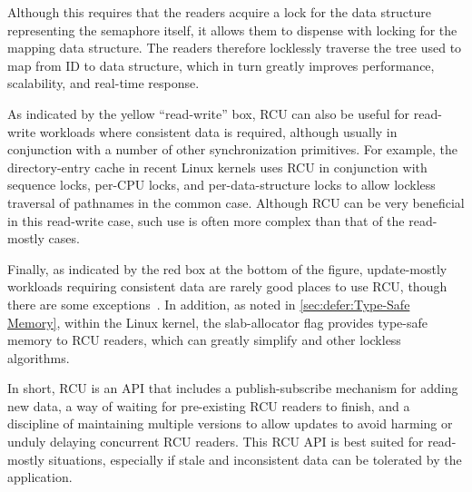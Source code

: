 Although this requires that the readers acquire a lock for the
data structure representing the semaphore itself,
it allows them to dispense with locking for the
mapping data structure.
The readers therefore locklessly
traverse the tree used to map from ID to data structure,
which in turn greatly improves performance, scalability, and
real-time response.

As indicated by the yellow ``read-write'' box, RCU can also be useful
for read-write
workloads where consistent data is required, although usually in
conjunction with a number of other synchronization primitives.
For example, the directory-entry cache in recent Linux kernels uses RCU in
conjunction with sequence locks, per-CPU locks, and per-data-structure
locks to allow lockless traversal of pathnames in the common case.
Although RCU can be very beneficial in this read-write case, such
use is often more complex than that of the read-mostly cases.

Finally, as indicated by the red box at the bottom of the figure,
update-mostly workloads requiring
consistent data are rarely good places to use RCU, though there are some
exceptions~\cite{MathieuDesnoyers2012URCU}.
In addition, as noted in
\cref{sec:defer:Type-Safe Memory},
within the Linux kernel, the 
slab-allocator flag provides type-safe memory to RCU readers, which can
greatly simplify  and other lockless
algorithms.

In short, RCU is an API that includes a publish-subscribe mechanism for
adding new data, a way of waiting for pre-existing RCU readers to finish,
and a discipline of maintaining multiple versions to allow updates to
avoid harming or unduly delaying concurrent RCU readers.
This RCU API is best suited for read-mostly situations, especially if
stale and inconsistent data can be tolerated by the application.
